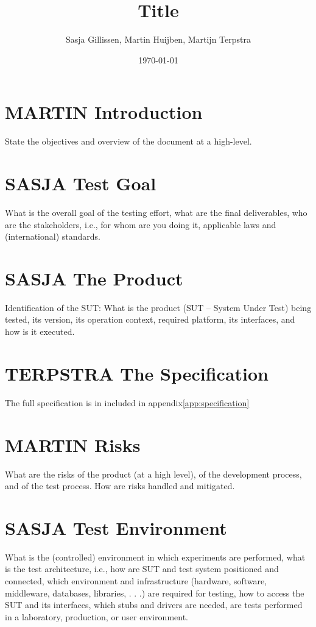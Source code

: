 \documentclass[11pt,a4paper]{article}
\author{Sasja Gillissen, Martin Huijben, Martijn Terpstra}
\date{\today}
\title{Title}
\begin{document}
\maketitle

\section{MARTIN Introduction}
State the objectives and overview of the document at a high-level.
\section{SASJA Test Goal}
What is the overall goal of the testing effort, what are the final deliverables, who are the
stakeholders, i.e., for whom are you doing it, applicable laws and (international) standards.
\section{SASJA The Product}
Identification of the SUT: What is the product (SUT – System Under Test) being tested, its
version, its operation context, required platform, its interfaces, and how is it executed.
\section{TERPSTRA The Specification}
The full specification is in included in appendix\ref{app:specification}

\section{MARTIN Risks}
What are the risks of the product (at a high level), of the development process, and of the
test process. How are risks handled and mitigated.
\section{SASJA Test Environment}
What is the (controlled) environment in which experiments are performed, what is the test
architecture, i.e., how are SUT and test system positioned and connected, which environment
and infrastructure (hardware, software, middleware, databases, libraries, . . .) are required for
testing, how to access the SUT and its interfaces, which stubs and drivers are needed, are
tests performed in a laboratory, production, or user environment.
\end{document}
